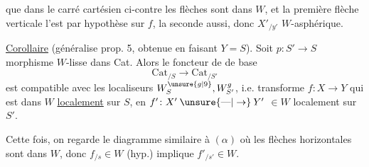 
que dans le carré cartésien ci-contre les flèches  sont dans $W$, et la première flèche verticale l'est par hypothèse sur $f$,  la seconde aussi, donc $X'_{/y'}$ $W$-asphérique.

 \uline{Corollaire} (généralise prop. 5, obtenue en faisant $Y=S$). Soit $p\colon S'\to S$ morphisme $W$-lisse dans Cat. Alors le foncteur de  de base
\[
\mathrm{Cat}_{/S}\longrightarrow\mathrm{Cat}_{/S'}
\]
est compatible avec les localiseurs $W_S^{\unsure{g|9}}, W_{S'}^g$, i.e. transforme $f\colon X\to Y$ qui est dans $W$ \uline{localement} sur $S$, en $f'\colon X'\mathbin{\unsure{\text{---}|\to}}Y'$  $\in W$ localement sur $S'$.

Cette fois, on regarde le diagramme similaire à $(\alpha)$
où les flèches horizontales sont dans $W$, donc $f_{/s}\in W$ (hyp.) implique $f'_{/s'}\in W$.


